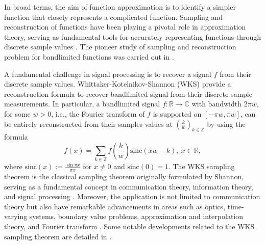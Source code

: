 \documentclass[11pt, a4paper]{article}
\theoremstyle{definition}
\numberwithin{equation}{section}
\def\CC{\mathbb C}
\def\ZZ{\mathbb Z}
\def\RR{\mathbb R}
\def\sinc{\text{sinc}}
\begin{document}
In broad terms, the aim of function approximation is to identify a simpler function that closely represents a complicated function. Sampling and reconstruction of functions have been playing a pivotal role in approximation theory, serving as fundamental tools for accurately representing functions through discrete sample values \cite{branch}. The pioneer study of sampling and reconstruction problem for bandlimited functions was carried out in \cite{ but,survey,noise}.
\par 
A fundamental challenge in signal processing is to recover a signal $f$ from their discrete sample values. Whittaker-Kotelnikov-Shannon (WKS) \cite{survey,past, vgood} provide a reconstruction formula to recover bandlimited signal from their discrete sample measurements.
In particular, a bandlimited signal $f:\RR \rightarrow \CC$ with bandwidth $2\pi w$, for some $w>0$, i.e., the Fourier transform of $f$ is supported on $[-\pi w,\pi w]$, can be entirely reconstructed from their samples values at $(\frac{k}{w})_{k \in \ZZ}$ by using the formula
\begin{equation}\label{shannon}
    f(x)=\sum_{k\in \ZZ} f\left(\frac{k}{w} \right)\sinc(xw-k),\ x \in \RR,
\end{equation}
where $\sinc(x) :=\frac{\sin \pi x} {\pi x}$ for $x\neq 0$ and $\sinc(0)=1$.
The WKS sampling theorem is the classical sampling theorem originally formulated by Shannon, serving as a fundamental concept in communication theory, information theory, and signal processing \cite{survey,  branch,jerry}. 
Moreover, the application is not limited to communication theory but also have remarkable advancements in areas such as optics, time-varying systems, boundary value problems, approximation and interpolation theory, and Fourier transform \cite{branch,jerry,noise}.
Some notable developments related to the WKS sampling theorem are detailed in \cite{delta,survey, butzer,  vgood,  jerry}.
\end{document}
